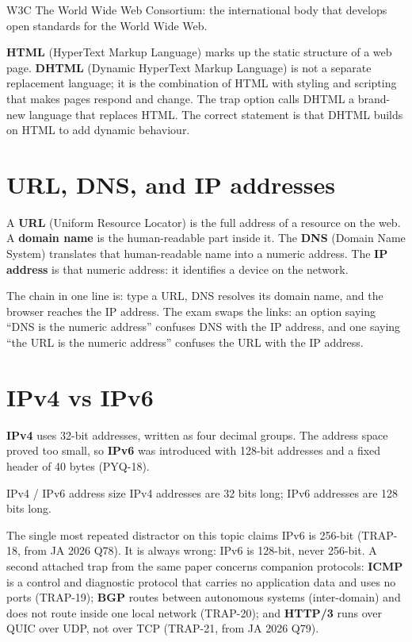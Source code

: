 \begin{definitionbox}{W3C}
The World Wide Web Consortium: the international body that develops open
standards for the World Wide Web.
\end{definitionbox}

\textbf{HTML} (HyperText Markup Language) marks up the static structure of a
web page. \textbf{DHTML} (Dynamic HyperText Markup Language) is not a
separate replacement language; it is the combination of HTML with styling and
scripting that makes pages respond and change. The trap option calls DHTML a
brand-new language that replaces HTML. The correct statement is that DHTML
builds on HTML to add dynamic behaviour.

\section{URL, DNS, and IP addresses}
A \textbf{URL} (Uniform Resource Locator) is the full address of a resource
on the web. A \textbf{domain name} is the human-readable part inside it. The
\textbf{DNS} (Domain Name System) translates that human-readable name into a
numeric address. The \textbf{IP address} is that numeric address: it
identifies a device on the network.

The chain in one line is: type a URL, DNS resolves its domain name, and the
browser reaches the IP address. The exam swaps the links: an option saying
``DNS is the numeric address'' confuses DNS with the IP address, and one
saying ``the URL is the numeric address'' confuses the URL with the IP
address.

\section{IPv4 vs IPv6}
\textbf{IPv4} uses 32-bit addresses, written as four decimal groups. The
address space proved too small, so \textbf{IPv6} was introduced with 128-bit
addresses and a fixed header of 40 bytes (PYQ-18).

\begin{definitionbox}{IPv4 / IPv6 address size}
IPv4 addresses are 32 bits long; IPv6 addresses are 128 bits long.
\end{definitionbox}

The single most repeated distractor on this topic claims IPv6 is 256-bit
(TRAP-18, from JA 2026 Q78). It is always wrong: IPv6 is 128-bit, never
256-bit. A second attached trap from the same paper concerns companion
protocols: \textbf{ICMP} is a control and diagnostic protocol that carries no
application data and uses no ports (TRAP-19); \textbf{BGP} routes between
autonomous systems (inter-domain) and does not route inside one local network
(TRAP-20); and \textbf{HTTP/3} runs over QUIC over UDP, not over TCP
(TRAP-21, from JA 2026 Q79).

